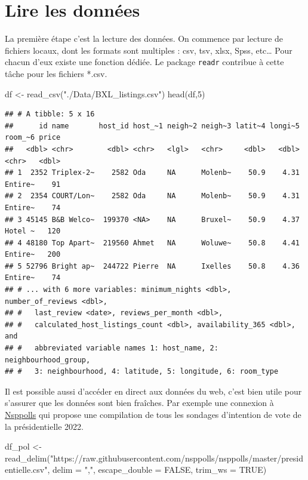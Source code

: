 \documentclass[
]{book}
\newenvironment{Shaded}{\begin{snugshade}}{\end{snugshade}}
\newcommand{\AttributeTok}[1]{\textcolor[rgb]{0.77,0.63,0.00}{#1}}
\newcommand{\ConstantTok}[1]{\textcolor[rgb]{0.00,0.00,0.00}{#1}}
\newcommand{\DecValTok}[1]{\textcolor[rgb]{0.00,0.00,0.81}{#1}}
\newcommand{\FunctionTok}[1]{\textcolor[rgb]{0.00,0.00,0.00}{#1}}
\newcommand{\NormalTok}[1]{#1}
\newcommand{\OtherTok}[1]{\textcolor[rgb]{0.56,0.35,0.01}{#1}}
\newcommand{\StringTok}[1]{\textcolor[rgb]{0.31,0.60,0.02}{#1}}
\begin{document}
\hypertarget{lire-les-donnuxe9es}{%
\section{Lire les données}\label{lire-les-donnuxe9es}}

La première étape c'est la lecture des données. On commence par lecture de fichiers locaux, dont les formats sont multiples : csv, tsv, xlsx, Spss, etc\ldots{} Pour chacun d'eux existe une fonction dédiée.
Le package \texttt{readr} contribue à cette tâche pour les fichiers *.csv.

\begin{Shaded}
\begin{Highlighting}[]
\NormalTok{df }\OtherTok{\textless{}{-}} \FunctionTok{read\_csv}\NormalTok{(}\StringTok{"./Data/BXL\_listings.csv"}\NormalTok{)}
\FunctionTok{head}\NormalTok{(df,}\DecValTok{5}\NormalTok{)}
\end{Highlighting}
\end{Shaded}

\begin{verbatim}
## # A tibble: 5 x 16
##      id name       host_id host_~1 neigh~2 neigh~3 latit~4 longi~5 room_~6 price
##   <dbl> <chr>        <dbl> <chr>   <lgl>   <chr>     <dbl>   <dbl> <chr>   <dbl>
## 1  2352 Triplex-2~    2582 Oda     NA      Molenb~    50.9    4.31 Entire~    91
## 2  2354 COURT/Lon~    2582 Oda     NA      Molenb~    50.9    4.31 Entire~    74
## 3 45145 B&B Welco~  199370 <NA>    NA      Bruxel~    50.9    4.37 Hotel ~   120
## 4 48180 Top Apart~  219560 Ahmet   NA      Woluwe~    50.8    4.41 Entire~   200
## 5 52796 Bright ap~  244722 Pierre  NA      Ixelles    50.8    4.36 Entire~    74
## # ... with 6 more variables: minimum_nights <dbl>, number_of_reviews <dbl>,
## #   last_review <date>, reviews_per_month <dbl>,
## #   calculated_host_listings_count <dbl>, availability_365 <dbl>, and
## #   abbreviated variable names 1: host_name, 2: neighbourhood_group,
## #   3: neighbourhood, 4: latitude, 5: longitude, 6: room_type
\end{verbatim}

Il est possible aussi d'accéder en direct aux données du web, c'est bien utile pour s'assurer que les données sont bien fraîches. Par exemple une connexion à \href{https://github.com/nsppolls/nsppolls}{Nsppolls} qui propose une compilation de tous les sondages d'intention de vote de la présidentielle 2022.

\begin{Shaded}
\begin{Highlighting}[]
\NormalTok{df\_pol }\OtherTok{\textless{}{-}} \FunctionTok{read\_delim}\NormalTok{(}\StringTok{"https://raw.githubusercontent.com/nsppolls/nsppolls/master/presidentielle.csv"}\NormalTok{, }
                     \AttributeTok{delim =} \StringTok{","}\NormalTok{, }\AttributeTok{escape\_double =} \ConstantTok{FALSE}\NormalTok{, }\AttributeTok{trim\_ws =} \ConstantTok{TRUE}\NormalTok{)}
\end{Highlighting}
\end{Shaded}
\end{document}
